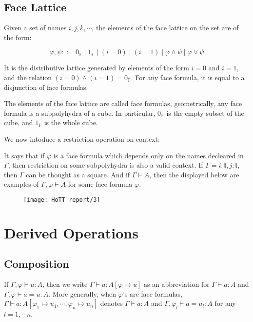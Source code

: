 \documentclass[11pt]{article}
\begin{document}
\subsection{Face Lattice}

Given a set of names $i,j,k,\cdots$, the elements of the face lattice on the set are of the form:

$$\varphi,\psi::= 0_{\mathbb F}\mid 1_{\mathbb F}\mid (i=0)\mid(i=1)\mid \varphi\land \psi\mid \varphi\lor\psi$$

It is the distributive lattice generated by elements of the form $i=0$ and $i=1$, and the relation $(i=0)\land (i=1) = 0_{\mathbb F}$. For any face formula, it is equal to a disjunction of face formulas.

The elements of the face lattice are called face formulas, geometrically, any face formula is a subpolyhydra of a cube. In particular, $0_{\mathbb F}$ is the empty subset of the cube, and $1_{\mathbb F}$ is the whole cube.

We now intoduce a restriction operation on context:

\begin{mathpar}
\end{mathpar}

It says that if $\varphi$ is a face formula which depends only on the names decleared in $\Gamma$, then restriction on some subpolyhydra is also a valid context. If $\Gamma = i:\mathbb I,j:\mathbb I$, then $\Gamma$ can be thought as a square. And if $\Gamma\vdash A$, then the displayed below are examples of $\Gamma, \varphi\vdash A$ for some face formula $\varphi$.
\begin{figure}[ht]
	\centering
	\texttt{[image: HoTT\_report/3]}
\end{figure}

\section{Derived Operations}
\subsection{Composition}

If $\Gamma,\varphi\vdash u:A$, then we write $\Gamma\vdash a:A[\varphi\mapsto u]$ as an abbreviation for $\Gamma\vdash a:A$ and $\Gamma,\varphi\vdash a = u:A$. More generally, when $\varphi$'s are face formulas, $\Gamma\vdash a:A[\varphi_1\mapsto u_1,\cdots,\varphi_n\mapsto u_n]$ denotes $\Gamma\vdash a:A$ and $\Gamma,\varphi_l\vdash a=u_l:A$ for any $l=1,\cdots n$.
\end{document}
